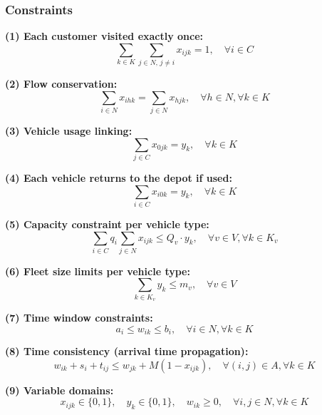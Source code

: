 \documentclass[11pt]{article}
\begin{document}
\subsubsection{Constraints}

\textbf{(1) Each customer visited exactly once:}
\begin{equation}
\sum_{k \in K} \sum_{j \in N,\, j \neq i} x_{ijk} = 1, \quad \forall i \in C
\end{equation}

\textbf{(2) Flow conservation:}
\begin{equation}
\sum_{i \in N} x_{ihk} = \sum_{j \in N} x_{hjk}, \quad \forall h \in N, \forall k \in K
\end{equation}

\textbf{(3) Vehicle usage linking:}
\begin{equation}
\sum_{j \in C} x_{0jk} = y_k, \quad \forall k \in K
\end{equation}

\textbf{(4) Each vehicle returns to the depot if used:}
\begin{equation}
\sum_{i \in C} x_{i0k} = y_k, \quad \forall k \in K
\end{equation}

\textbf{(5) Capacity constraint per vehicle type:}
\begin{equation}
\sum_{i \in C} q_i \sum_{j \in N} x_{ijk} \leq Q_v \cdot y_k, \quad \forall v \in V, \forall k \in K_v
\end{equation}

\textbf{(6) Fleet size limits per vehicle type:}
\begin{equation}
\sum_{k \in K_v} y_k \leq m_v, \quad \forall v \in V
\end{equation}

\textbf{(7) Time window constraints:}
\begin{equation}
a_i \leq w_{ik} \leq b_i, \quad \forall i \in N, \forall k \in K
\end{equation}

\textbf{(8) Time consistency (arrival time propagation):}
\begin{equation}
w_{ik} + s_i + t_{ij} \leq w_{jk} + M(1 - x_{ijk}), \quad \forall (i,j) \in A, \forall k \in K
\end{equation}

\textbf{(9) Variable domains:}
\begin{equation}
x_{ijk} \in \{0,1\}, \quad y_k \in \{0,1\}, \quad w_{ik} \geq 0, \quad \forall i,j \in N, \forall k \in K
\end{equation}
\end{document}
